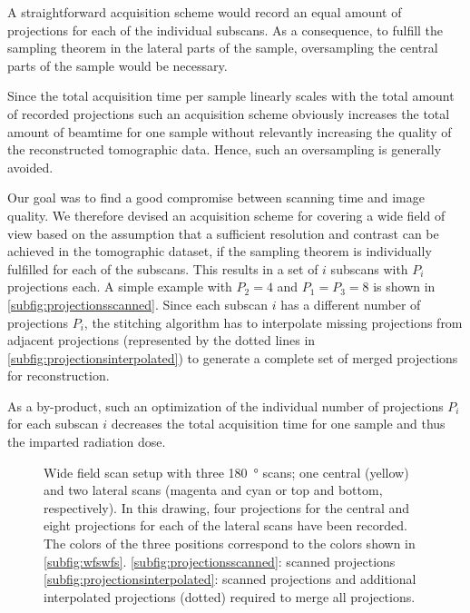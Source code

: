 A straightforward acquisition scheme would record an equal amount of projections for each of the individual subscans. As a consequence, to fulfill the sampling theorem in the lateral parts of the sample, oversampling the central parts of the sample would be necessary.

Since the total acquisition time per sample linearly scales with the total amount of recorded projections such an acquisition scheme obviously increases the total amount of beamtime for one sample without relevantly increasing the quality of the reconstructed tomographic data. Hence, such an oversampling is generally avoided.

Our goal was to find a good compromise between scanning time and image quality. We therefore devised an acquisition scheme for covering a wide field of view based on the assumption that a sufficient resolution and contrast can be achieved in the tomographic dataset, if the sampling theorem is individually fulfilled for each of the subscans. This results in a set of $i$ subscans with $P_{i}$ projections each. A simple example with $P_{2}=4$ and $P_{1}=P_{3}=8$ is shown in \autoref{subfig:projectionsscanned}. Since each subscan $i$ has a different number of projections $P_{i}$, the stitching algorithm has to interpolate missing projections from adjacent projections (represented by the dotted lines in \autoref{subfig:projectionsinterpolated}) to generate a complete set of merged projections for reconstruction.

As a by-product, such an optimization of the individual number of projections $P_{i}$ for each subscan $i$ decreases the total acquisition time for one sample and thus the imparted radiation dose.

\begin{figure}
	\centering
	\noindent{}%
	\caption[Wide field scan setup]{Wide field scan setup with three \SI{180}{\degree} scans; one central (yellow) and two lateral scans (magenta and cyan or top and bottom, respectively). In this drawing, four projections for the central and eight projections for each of the lateral scans have been recorded. The colors of the three positions correspond to the colors shown in \autoref{subfig:wfswfs}. %
	\ref{subfig:projectionsscanned}: scanned projections %
	\ref{subfig:projectionsinterpolated}: scanned projections and additional interpolated projections (dotted) required to merge all projections.}
	\label{fig:projections}
\end{figure}	

